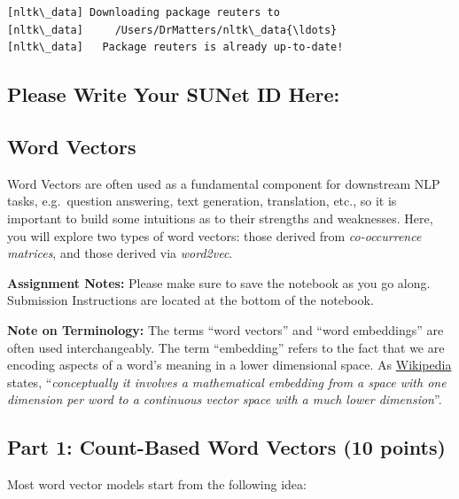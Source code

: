 \documentclass[11pt]{article}
\begin{document}
    \begin{Verbatim}[commandchars=\\\{\}]
[nltk\_data] Downloading package reuters to
[nltk\_data]     /Users/DrMatters/nltk\_data{\ldots}
[nltk\_data]   Package reuters is already up-to-date!

    \end{Verbatim}

    \hypertarget{please-write-your-sunet-id-here}{%
\subsection{Please Write Your SUNet ID
Here:}\label{please-write-your-sunet-id-here}}

    \hypertarget{word-vectors}{%
\subsection{Word Vectors}\label{word-vectors}}

Word Vectors are often used as a fundamental component for downstream
NLP tasks, e.g.~question answering, text generation, translation, etc.,
so it is important to build some intuitions as to their strengths and
weaknesses. Here, you will explore two types of word vectors: those
derived from \emph{co-occurrence matrices}, and those derived via
\emph{word2vec}.

\textbf{Assignment Notes:} Please make sure to save the notebook as you
go along. Submission Instructions are located at the bottom of the
notebook.

\textbf{Note on Terminology:} The terms ``word vectors'' and ``word
embeddings'' are often used interchangeably. The term ``embedding''
refers to the fact that we are encoding aspects of a word's meaning in a
lower dimensional space. As
\href{https://en.wikipedia.org/wiki/Word_embedding}{Wikipedia} states,
``\emph{conceptually it involves a mathematical embedding from a space
with one dimension per word to a continuous vector space with a much
lower dimension}''.

    \hypertarget{part-1-count-based-word-vectors-10-points}{%
\subsection{Part 1: Count-Based Word Vectors (10
points)}\label{part-1-count-based-word-vectors-10-points}}

Most word vector models start from the following idea:
\end{document}
